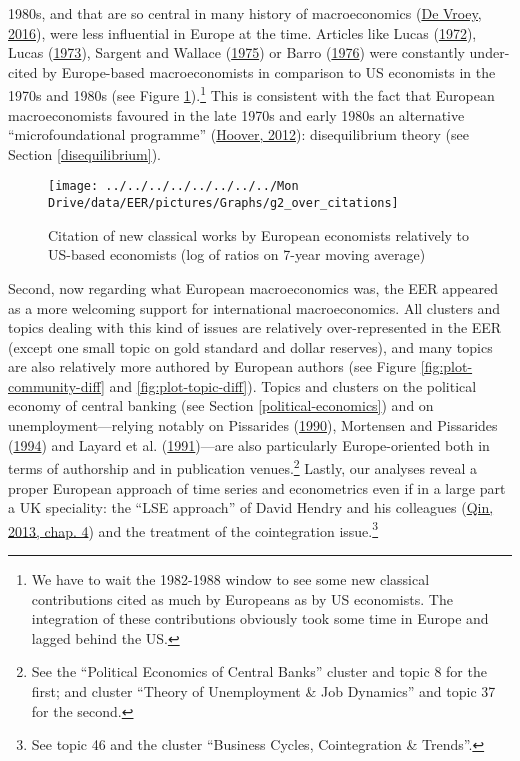 \documentclass[
]{article}
\begin{document}
1980s, and that are so central in many history of macroeconomics
(\protect\hyperlink{ref-devroey2016}{De Vroey, 2016}), were less
influential in Europe at the time. Articles like Lucas
(\protect\hyperlink{ref-lucas1972}{1972}), Lucas
(\protect\hyperlink{ref-lucas1973}{1973}), Sargent and Wallace
(\protect\hyperlink{ref-sargent1975}{1975}) or Barro
(\protect\hyperlink{ref-barro1976}{1976}) were constantly under-cited by
Europe-based macroeconomists in comparison to US economists in the 1970s
and 1980s (see Figure \ref{fig:plot-new-classical}).\footnote{We have to
  wait the 1982-1988 window to see some new classical contributions
  cited as much by Europeans as by US economists. The integration of
  these contributions obviously took some time in Europe and lagged
  behind the US.} This is consistent with the fact that European
macroeconomists favoured in the late 1970s and early 1980s an
alternative ``microfoundational programme''
(\protect\hyperlink{ref-hoover2012}{Hoover, 2012}): disequilibrium
theory (see Section \ref{disequilibrium}).

\begin{figure}[h]

{\centering \texttt{[image: ../../../../../../../../Mon Drive/data/EER/pictures/Graphs/g2\_over\_citations]} 

}

\caption{Citation of new classical works by European economists relatively to US-based economists (log of ratios on 7-year moving average)}\label{fig:plot-new-classical}
\end{figure}

Second, now regarding what European macroeconomics was, the EER appeared
as a more welcoming support for international macroeconomics. All
clusters and topics dealing with this kind of issues are relatively
over-represented in the EER (except one small topic on gold standard and
dollar reserves), and many topics are also relatively more authored by
European authors (see Figure \ref{fig:plot-community-diff} and
\ref{fig:plot-topic-diff}). Topics and clusters on the political economy
of central banking (see Section \ref{political-economics}) and on
unemployment---relying notably on Pissarides
(\protect\hyperlink{ref-pissarides1990}{1990}), Mortensen and Pissarides
(\protect\hyperlink{ref-mortensen1994}{1994}) and Layard et al.
(\protect\hyperlink{ref-layard1991a}{1991})---are also particularly
Europe-oriented both in terms of authorship and in publication
venues.\footnote{See the ``Political Economics of Central Banks''
  cluster and topic 8 for the first; and cluster ``Theory of
  Unemployment \& Job Dynamics'' and topic 37 for the second.} Lastly,
our analyses reveal a proper European approach of time series and
econometrics even if in a large part a UK speciality: the ``LSE
approach'' of David Hendry and his colleagues
(\protect\hyperlink{ref-qin2013a}{Qin, 2013, chap. 4}) and the treatment
of the cointegration issue.\footnote{See topic 46 and the cluster
  ``Business Cycles, Cointegration \& Trends''.}
\end{document}
